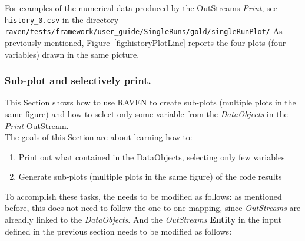 For examples of the numerical data produced by the OutStreams \textit{Print}, see \texttt{history\_0.csv} in the directory
 \texttt{raven/tests/framework/user\_guide/SingleRuns/gold/singleRunPlot/}
 As previously mentioned, Figure~\ref{fig:historyPlotLine} reports the four plots (four variables) drawn in the same picture.

\subsubsection{Sub-plot and selectively print.}
This Section shows how to use RAVEN to create sub-plots (multiple plots in the same figure) and
how to select only some variable from the \textit{DataObjects} in the \textit{Print} OutStream.
 \\ The goals of this Section are about learning how to:
 \begin{enumerate}
   \item Print out what contained in the DataObjects, selecting only few variables
   \item Generate sub-plots (multiple plots in the same figure) of the code results
\end{enumerate}

To accomplish these tasks, the  needs to be modified as follows:
\nb as mentioned before, this  does not need to follow the one-to-one mapping, since \textit{OutStreams}
are alreadly linked to the \textit{DataObjects}.
And the \textit{OutStreams} \textbf{Entity} in the input defined in the previous section needs to be modified as
follows:

